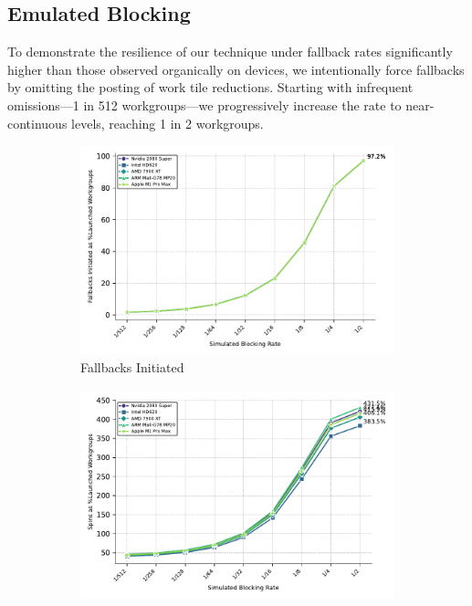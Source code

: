 \documentclass[sigconf]{acmart}
\begin{document}
\subsection{Emulated Blocking}
To demonstrate the resilience of our technique under fallback rates significantly higher than those observed organically on devices, we intentionally force fallbacks by omitting the posting of work tile reductions. Starting with infrequent omissions---1 in 512 workgroups---we progressively increase the rate to near-continuous levels, reaching 1 in 2 workgroups.
\begin{figure}
  \centering
  \begin{subfigure}{.9\linewidth}
    \centering
    \includegraphics[width=\linewidth]{graphics/fallbacksInitiated_plot.pdf}
    \caption{Fallbacks Initiated}
    \label{fig:fallbacks_initiated}
  \end{subfigure}
  \begin{subfigure}{.9\linewidth}
    \centering
    \includegraphics[width=\linewidth]{graphics/totalSpins_plot.pdf}

\end{subfigure}
\end{figure}
\end{document}
